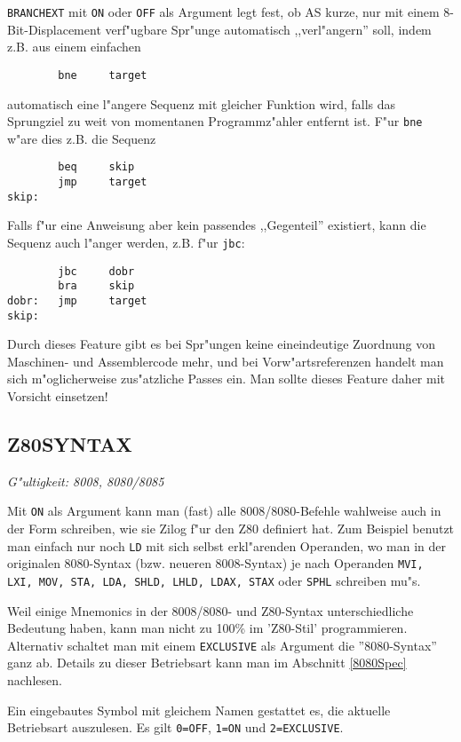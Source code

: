 \documentclass[12pt,a4paper,twoside]{report}
\makeatletter
\newcommand{\tty}[1]{{\tt #1}}
\newcommand{\ttindex}[1]{\index{#1@{\tt #1}}}
\makeatother
\begin{document}
{\tt BRANCHEXT} mit \tty{ON} oder \tty{OFF} als Argument legt fest, ob AS
kurze, nur mit einem 8-Bit-Displacement verf"ugbare Spr"unge automatisch
,,verl"angern'' soll, indem z.B. aus einem einfachen
\begin{verbatim}
        bne     target
\end{verbatim}
automatisch eine l"angere Sequenz mit gleicher Funktion wird, falls das
Sprungziel zu weit von momentanen Programmz"ahler entfernt ist.  F"ur
{\tt bne} w"are dies z.B. die Sequenz
\begin{verbatim}
        beq     skip
        jmp     target
skip:
\end{verbatim}
Falls f"ur eine Anweisung aber kein passendes ,,Gegenteil'' existiert,
kann die Sequenz auch l"anger werden, z.B. f"ur {\tt jbc}:
\begin{verbatim}
        jbc     dobr
        bra     skip
dobr:   jmp     target
skip:
\end{verbatim}
Durch dieses Feature gibt es bei Spr"ungen keine eineindeutige Zuordnung
von Maschinen- und Assemblercode mehr, und bei Vorw"artsreferenzen handelt
man sich m"oglicherweise zus"atzliche Passes ein.  Man sollte dieses
Feature daher mit Vorsicht einsetzen!


\subsection{Z80SYNTAX}
\ttindex{Z80SYNTAX}

{\em G"ultigkeit: 8008, 8080/8085}

Mit \tty{ON} als Argument kann man (fast) alle 8008/8080-Befehle wahlweise
auch in der Form schreiben, wie sie Zilog f"ur den Z80 definiert hat.
Zum Beispiel benutzt man einfach nur noch \tty{LD} mit sich selbst
erkl"arenden Operanden, wo man in der originalen 8080-Syntax (bzw.
neueren 8008-Syntax) je nach Operanden \tty{MVI, LXI, MOV, STA, LDA,
SHLD, LHLD, LDAX, STAX} oder \tty{SPHL} schreiben mu"s.

Weil einige Mnemonics in der 8008/8080- und Z80-Syntax unterschiedliche
Bedeutung haben, kann man nicht zu 100\% im 'Z80-Stil' programmieren.
Alternativ schaltet man mit einem \tty{EXCLUSIVE} als Argument die
''8080-Syntax'' ganz ab.  Details zu dieser Betriebsart kann man 
im Abschnitt \ref{8080Spec} nachlesen.

Ein eingebautes Symbol mit gleichem Namen gestattet es, die aktuelle
Betriebsart auszulesen.  Es gilt \tty{0=OFF}, \tty{1=ON} und
\tty{2=EXCLUSIVE}.
\end{document}
